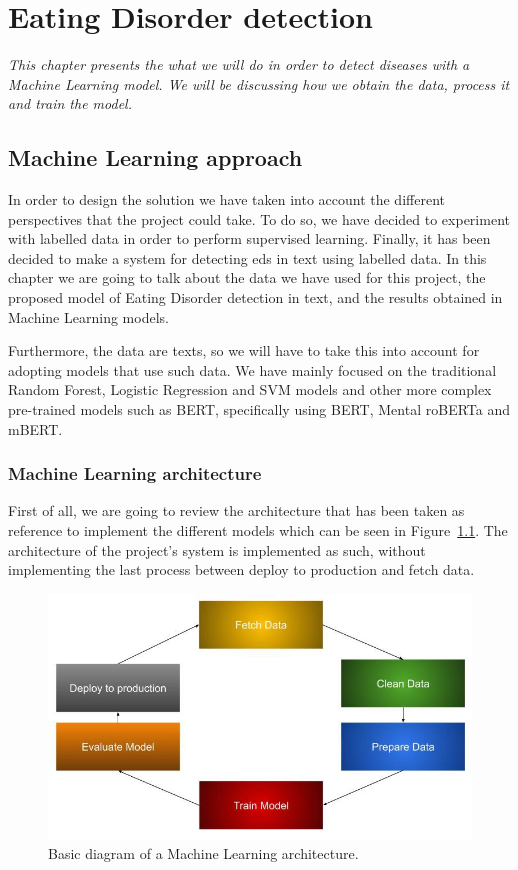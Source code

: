 \chapter{Eating Disorder detection}
\label{chap:architecture}
\textit{This chapter presents the what we will do in order to detect diseases with a Machine Learning model. We will be discussing how we obtain the data, process it and train the model.}

\clearpage
\section{Machine Learning approach}
In order to design the solution we have taken into account the different perspectives that the project could take. To do so, we have decided to experiment with labelled data in order to perform supervised learning. Finally, it has been decided to make a system for detecting eds in text using labelled data. In this chapter we are going to talk about the data we have used for this project, the proposed model of Eating Disorder detection in text, and the results obtained in Machine Learning models.

Furthermore, the data are texts, so we will have to take this into account for adopting models that use such data. We have mainly focused on the traditional Random Forest, Logistic Regression and SVM models and other more complex pre-trained models such as BERT, specifically using BERT, Mental roBERTa and mBERT.

\subsection{Machine Learning architecture}
First of all, we are going to review the architecture that has been taken as reference to implement the different models which can be seen in Figure~\ref{fig:mlarchitecture}. The architecture of the project's system is implemented as such, without implementing the last process between deploy to production and fetch data.

\begin{figure}[!htp]
    \centering
    \includegraphics[scale=0.55]{img/detection/mlarchitecture.jpeg}
    \caption{Basic diagram of a Machine Learning architecture.}
    \label{fig:mlarchitecture}
\end{figure}

